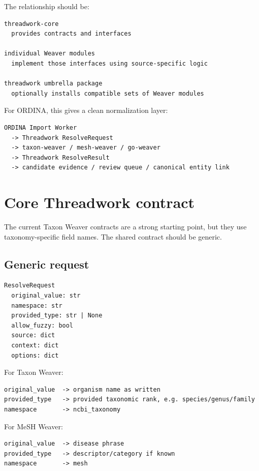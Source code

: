 \documentclass[11pt,a4paper]{article}
\begin{document}
The relationship should be:

\begin{Verbatim}[fontsize=\small]
threadwork-core
  provides contracts and interfaces

individual Weaver modules
  implement those interfaces using source-specific logic

threadwork umbrella package
  optionally installs compatible sets of Weaver modules
\end{Verbatim}

For ORDINA, this gives a clean normalization layer:

\begin{Verbatim}[fontsize=\small]
ORDINA Import Worker
  -> Threadwork ResolveRequest
  -> taxon-weaver / mesh-weaver / go-weaver
  -> Threadwork ResolveResult
  -> candidate evidence / review queue / canonical entity link
\end{Verbatim}

\section{Core Threadwork contract}

The current Taxon Weaver contracts are a strong starting point, but they use taxonomy-specific field names. The shared contract should be generic.

\subsection{Generic request}

\begin{Verbatim}[fontsize=\small]
ResolveRequest
  original_value: str
  namespace: str
  provided_type: str | None
  allow_fuzzy: bool
  source: dict
  context: dict
  options: dict
\end{Verbatim}

For Taxon Weaver:

\begin{Verbatim}[fontsize=\small]
original_value  -> organism name as written
provided_type   -> provided taxonomic rank, e.g. species/genus/family
namespace       -> ncbi_taxonomy
\end{Verbatim}

For MeSH Weaver:

\begin{Verbatim}[fontsize=\small]
original_value  -> disease phrase
provided_type   -> descriptor/category if known
namespace       -> mesh
\end{Verbatim}
\end{document}
